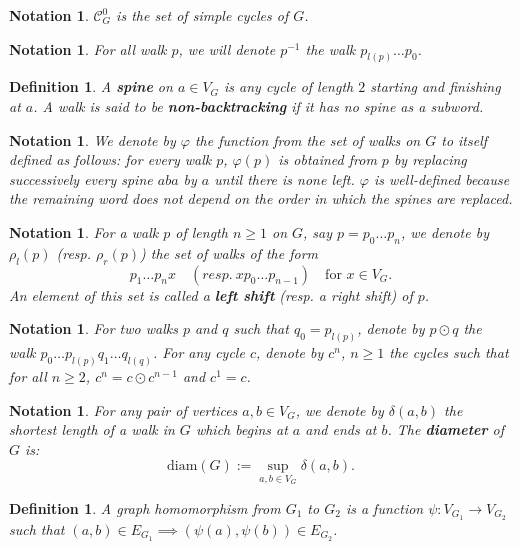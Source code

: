 \documentclass{article}
\newtheorem{definition}[theorem]{Definition}
\newtheorem{notation}[theorem]{Notation}
\newcommand\bt[1]{\varphi(#1)}
\begin{document}
\begin{notation}\label{notation.simple.cycle}
$\mathcal{C}^0_G$ is the set of simple cycles of $G$. 
\end{notation}

\begin{notation}\label{notation:opposite}
For all walk $p$, we will denote $p^{-1}$ the walk $p_{l(p)} \ldots p_0$.
\end{notation}

\begin{definition}
A \textbf{spine} on $a\in V_G$ is any cycle of length $2$ starting and finishing at $a$. A walk is said to be \textbf{non-backtracking} if it has no spine as a subword. 
\end{definition} 

\begin{notation}
We denote by $\varphi$ the function from the set of walks on $G$ to itself defined as follows: for every walk $p$, $\bt{p}$ is obtained from $p$ by replacing successively every spine $aba$ by $a$ until there is none left. $\varphi$ is well-defined because the remaining word does not depend on the order in which the spines are replaced. 
\end{notation}

\begin{notation}
For a walk $p$ of length $n \ge 1$ on $G$, say $p=p_0 \hdots p_{n}$, we denote by $\rho_l(p)$ (resp. $\rho_r(p)$) the set of walks of the form 
\[p_1 \hdots p_{n} x \quad (resp. \ x p_0 \hdots p_{n-1})\quad \text{for }x\in V_G.\] 
An element of this set is called a \textbf{left shift} (resp. a right shift) of $p$.
\end{notation}

\begin{notation}
For two walks $p$ and $q$ such that $q_0 = p_{l(p)}$, denote by $p \odot q$ the 
walk $p_0 \hdots p_{l(p)} q_1 \hdots q_{l(q)}$.
For any cycle $c$, denote by $c^n$, $n \ge 1$ the cycles such 
that for all $n \ge 2$, $c^n = c \odot c^{n-1}$ and $c^1 = c$.
\end{notation}

\begin{notation}
For any pair of vertices $a,b \in V_G$, we denote by $\delta(a,b)$ the shortest length of a walk in $G$ which begins at $a$ and ends at $b$. The \textbf{diameter} of $G$ is: 
\[\text{diam}(G) := \sup_{a,b \in V_G} \delta(a,b).\]
\end{notation}

\begin{definition}
A \emph{graph homomorphism} from $G_1$ to $G_2$ is a function $\psi: V_{G_1} \to V_{G_2}$ such that $(a,b)\in E_{G_1} \implies (\psi(a),\psi(b))\in E_{G_2}$.
\end{definition}
\end{document}
